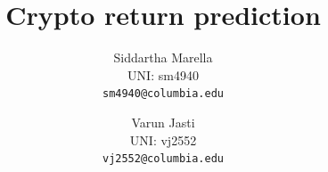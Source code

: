 \documentclass[final]{cvpr}
\begin{document}
\title{Crypto return prediction}

\author{Siddartha Marella\\
UNI: sm4940\\
{\tt\small sm4940@columbia.edu}
\and
Varun Jasti\\
UNI: vj2552\\
{\tt\small vj2552@columbia.edu}
}

\maketitle


\end{document}
